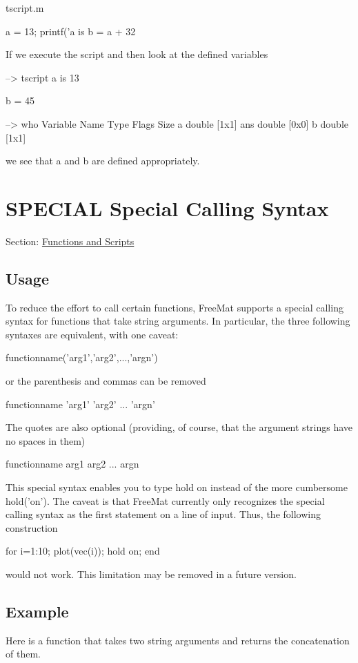 \begin{DoxyVerb}     tscript.m
\end{DoxyVerb}



\begin{DoxyVerbInclude}
a = 13;
printf('a is %
b = a + 32
\end{DoxyVerbInclude}


If we execute the script and then look at the defined variables


\begin{DoxyVerbInclude}
--> tscript
a is 13

b = 
 45 

--> who
  Variable Name       Type   Flags             Size
              a    double                    [1x1]
            ans    double                    [0x0]
              b    double                    [1x1]
\end{DoxyVerbInclude}


we see that {\ttfamily a} and {\ttfamily b} are defined appropriately. \hypertarget{functions_special}{}\section{S\-P\-E\-C\-I\-A\-L Special Calling Syntax}\label{functions_special}
Section\-: \hyperlink{sec_functions}{Functions and Scripts} \hypertarget{vtkwidgets_vtkxyplotwidget_Usage}{}\subsection{Usage}\label{vtkwidgets_vtkxyplotwidget_Usage}
To reduce the effort to call certain functions, Free\-Mat supports a special calling syntax for functions that take string arguments. In particular, the three following syntaxes are equivalent, with one caveat\-: \begin{DoxyVerb}   functionname('arg1','arg2',...,'argn')
\end{DoxyVerb}
 or the parenthesis and commas can be removed \begin{DoxyVerb}   functionname 'arg1' 'arg2' ... 'argn'
\end{DoxyVerb}
 The quotes are also optional (providing, of course, that the argument strings have no spaces in them) \begin{DoxyVerb}   functionname arg1 arg2 ... argn
\end{DoxyVerb}
 This special syntax enables you to type {\ttfamily hold on} instead of the more cumbersome {\ttfamily hold('on')}. The caveat is that Free\-Mat currently only recognizes the special calling syntax as the first statement on a line of input. Thus, the following construction \begin{DoxyVerb}  for i=1:10; plot(vec(i)); hold on; end
\end{DoxyVerb}
 would not work. This limitation may be removed in a future version. \hypertarget{variables_struct_Example}{}\subsection{Example}\label{variables_struct_Example}
Here is a function that takes two string arguments and returns the concatenation of them.

